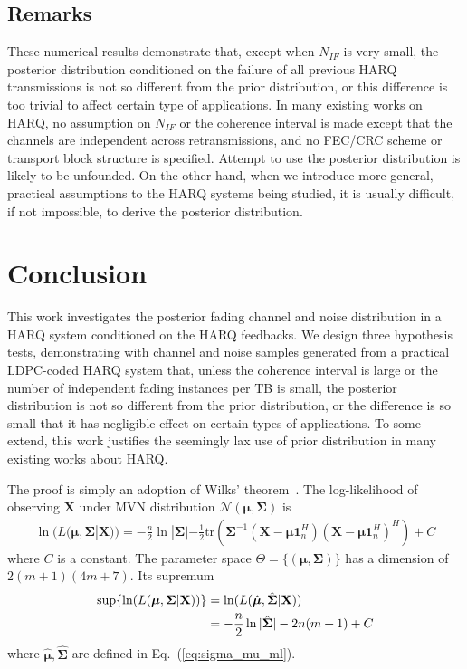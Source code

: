 \documentclass[journal,draftcls,onecolumn,12pt,twoside]{IEEEtran}
\begin{document}
\subsection{Remarks}
These numerical results demonstrate that, except when $N_{IF}$ is very small,
the posterior distribution conditioned on the failure of all previous HARQ
transmissions is not so different from the prior distribution, or this
difference is too trivial to affect certain type of applications. 
In many existing works on HARQ, no assumption on $N_{IF}$ or the coherence
interval is made except that the channels are independent across
retransmissions, and no FEC/CRC scheme or transport block structure is
specified. Attempt to use the posterior distribution is likely to be unfounded.
On the other hand, when we introduce more general, practical assumptions to the
HARQ systems being studied, it is usually difficult, if not impossible, to
derive the posterior distribution.

\section{Conclusion}
\label{sec:conclusion}
This work investigates the posterior fading channel and noise distribution in
a HARQ system conditioned on the HARQ feedbacks. We design three hypothesis tests,
demonstrating with channel and noise samples generated from a practical
LDPC-coded HARQ system that, unless the coherence interval is large or the
number of independent fading instances per TB is small, the posterior distribution is
not so different from the prior distribution, or the difference is so small that
it has negligible effect on certain types of applications. To some extend, this
work justifies the seemingly lax use of prior distribution in many existing
works about HARQ.

\label{append:proof}
The proof is simply an adoption of Wilks' theorem~\cite{wilks1938large}. The
log-likelihood of observing $\mathbf{X}$ under MVN distribution
$\mathcal{N}(\bm{\mu}, \mathbf{\Sigma})$ is
\begin{align}
  \ln(L(\bm{\mu}, \mathbf{\Sigma}|\mathbf{X})) =
  -\frac{n}{2}\ln|\mathbf{\Sigma}|-
  \frac{1}{2}\mbox{tr}(\mathbf{\Sigma}^{-1}(\mathbf{X}
  -\bm{\mu}\mathbf{1}_n^H)(\mathbf{X} -\bm{\mu}\mathbf{1}_n^H)^H) + C  
\end{align}
where $C$ is a constant. The parameter space $\Theta = \{(\bm{\mu},
\mathbf{\Sigma})\}$ has a dimension of $2(m+1)(4m+7)$. Its supremum
\begin{align}
  \sup \{\ln(L(\bm{\mu}, \mathbf{\Sigma}|\mathbf{X}))\} & =
  \ln(L(\hat{\bm{\mu}}, \hat{\mathbf{\Sigma}}|\mathbf{X})) \notag\\
  & = -\frac{n}{2}\ln|\hat{\mathbf{\Sigma}}| - 2n(m+1) + C
\end{align}
where $\hat{\bm{\mu}}, \hat{\mathbf{\Sigma}}$ are defined in
Eq.~(\ref{eq:sigma_mu_ml}).
\end{document}
